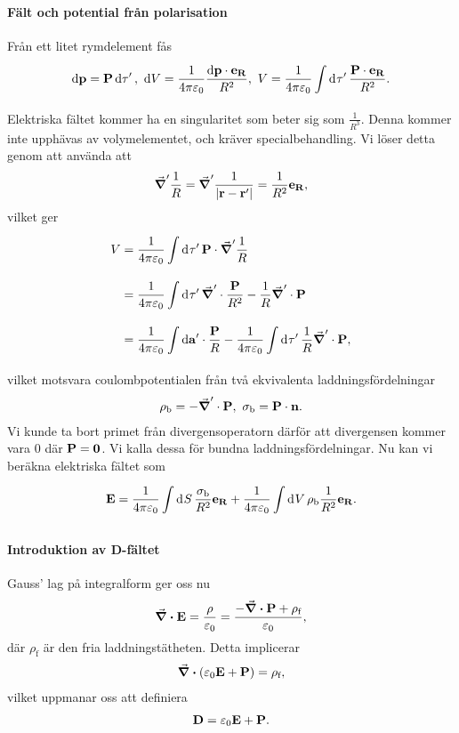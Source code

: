 \paragraph{Fält och potential från polarisation}
Från ett litet rymdelement fås
\begin{align*}
	\dd{\vb{p}} = \vb{P}\dd{\tau'},\ \dd{V} = \frac{1}{4\pi\varepsilon_{0}}\frac{\dd{\vb{p}}\cdot\vb{e}_{\vb{R}}}{R^{2}},\ V = \frac{1}{4\pi\varepsilon_{0}}\int\limits_{}^{}\dd[]{\tau'}\frac{\vb{P}\cdot\vb{e}_{\vb{R}}}{R^{2}}.
\end{align*}
Elektriska fältet kommer ha en singularitet som beter sig som $\frac{1}{R^{3}}$. Denna kommer inte upphävas av volymelementet, och kräver specialbehandling. Vi löser detta genom att använda att
\begin{align*}
	\grad'{\frac{1}{R}} = \grad'{\frac{1}{\abs{\vb{r} - \vb{r}'}}} = \frac{1}{R^{2}}\vb{e}_{\vb{R}},
\end{align*}
vilket ger
\begin{align*}
	V &= \frac{1}{4\pi\varepsilon_{0}}\int\limits_{}^{}\dd[]{\tau'}\vb{P}\cdot\grad^{\prime}{\frac{1}{R}} \\
	  &= \frac{1}{4\pi\varepsilon_{0}}\int\limits_{}^{}\dd[]{\tau'}\grad^{\prime}\cdot{\frac{\vb{P}}{R^{2}}} - \frac{1}{R}\grad^{\prime}\cdot{\vb{P}} \\
	  &= \frac{1}{4\pi\varepsilon_{0}}\int\limits_{}^{}\dd{\vb{a'}}\cdot \frac{\vb{P}}{R} - \frac{1}{4\pi\varepsilon_{0}}\int\limits_{}^{}\dd[]{\tau'}\frac{1}{R}\grad^{\prime}\cdot{\vb{P}},
\end{align*}
vilket motsvara coulombpotentialen från två ekvivalenta laddningsfördelningar
\begin{align*}
	\rho_{\text{b}} = -\grad^{\prime}\cdot{\vb{P}},\ \sigma_{\text{b}} = \vb{P}\cdot\vb{n}.
\end{align*}
Vi kunde ta bort primet från divergensoperatorn därför att divergensen kommer vara $0$ där $\vb{P} = \vb{0}$. Vi kalla dessa för bundna laddningsfördelningar. Nu kan vi beräkna elektriska fältet som
\begin{align*}
	\vb{E} = \frac{1}{4\pi\varepsilon_{0}}\int\limits_{}^{}\dd[]{S}\frac{\sigma_{\text{b}}}{R^{2}}\vb{e}_{\vb{R}} + \frac{1}{4\pi\varepsilon_{0}}\int\limits_{}^{}\dd[]{V}\rho_{\text{b}}\frac{1}{R^{2}}\vb{e}_{\vb{R}}.
\end{align*}

\paragraph{Introduktion av D-fältet}
Gauss' lag på integralform ger oss nu
\begin{align*}
	\div{\vb{E}} = \frac{\rho}{\varepsilon_{0}} = \frac{-\div{\vb{P}} + \rho_{\text{f}}}{\varepsilon_{0}},
\end{align*}
där $\rho_{\text{f}}$ är den fria laddningstätheten. Detta implicerar
\begin{align*}
	\div(\varepsilon_{0}\vb{E} + \vb{P}) = \rho_{\text{f}},
\end{align*}
vilket uppmanar oss att definiera
\begin{align*}
	\vb{D} = \varepsilon_{0}\vb{E} + \vb{P}.
\end{align*}


